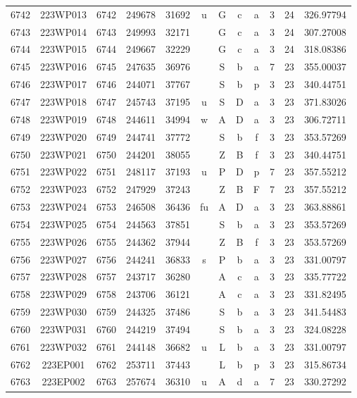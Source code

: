 \begin{tabular}{|*{12}{c|}}
6742 & 223WP013 & 6742 & 249678 & 31692 & u & G & c & a & 3 & 24 & 326.97794 \\ 
6743 & 223WP014 & 6743 & 249993 & 32171 &  & G & c & a & 3 & 24 & 307.27008 \\ 
6744 & 223WP015 & 6744 & 249667 & 32229 &  & G & c & a & 3 & 24 & 318.08386 \\ 
6745 & 223WP016 & 6745 & 247635 & 36976 &  & S & b & a & 7 & 23 & 355.00037 \\ 
6746 & 223WP017 & 6746 & 244071 & 37767 &  & S & b & p & 3 & 23 & 340.44751 \\ 
6747 & 223WP018 & 6747 & 245743 & 37195 & u & S & D & a & 3 & 23 & 371.83026 \\ 
6748 & 223WP019 & 6748 & 244611 & 34994 & w & A & D & a & 3 & 23 & 306.72711 \\ 
6749 & 223WP020 & 6749 & 244741 & 37772 &  & S & b & f & 3 & 23 & 353.57269 \\ 
6750 & 223WP021 & 6750 & 244201 & 38055 &  & Z & B & f & 3 & 23 & 340.44751 \\ 
6751 & 223WP022 & 6751 & 248117 & 37193 & u & P & D & p & 7 & 23 & 357.55212 \\ 
6752 & 223WP023 & 6752 & 247929 & 37243 &  & Z & B & F & 7 & 23 & 357.55212 \\ 
6753 & 223WP024 & 6753 & 246508 & 36436 & fu & A & D & a & 3 & 23 & 363.88861 \\ 
6754 & 223WP025 & 6754 & 244563 & 37851 &  & S & b & a & 3 & 23 & 353.57269 \\ 
6755 & 223WP026 & 6755 & 244362 & 37944 &  & Z & B & f & 3 & 23 & 353.57269 \\ 
6756 & 223WP027 & 6756 & 244241 & 36833 & s & P & b & a & 3 & 23 & 331.00797 \\ 
6757 & 223WP028 & 6757 & 243717 & 36280 &  & A & c & a & 3 & 23 & 335.77722 \\ 
6758 & 223WP029 & 6758 & 243706 & 36121 &  & A & c & a & 3 & 23 & 331.82495 \\ 
6759 & 223WP030 & 6759 & 244325 & 37486 &  & S & b & a & 3 & 23 & 341.54483 \\ 
6760 & 223WP031 & 6760 & 244219 & 37494 &  & S & b & a & 3 & 23 & 324.08228 \\ 
6761 & 223WP032 & 6761 & 244148 & 36682 & u & L & b & a & 3 & 23 & 331.00797 \\ 
6762 & 223EP001 & 6762 & 253711 & 37443 &  & L & b & p & 3 & 23 & 315.86734 \\ 
6763 & 223EP002 & 6763 & 257674 & 36310 & u & A & d & a & 7 & 23 & 330.27292 \\ 

\end{tabular}
